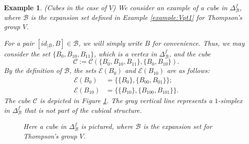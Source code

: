 \documentclass{amsart}
\newtheorem{Example}[theorem]{Example}
\newtheorem{standing assumption}[theorem]{Standing Assumption}
\newenvironment{example}{\begin{Example}\normalfont}{\end{Example}}
\begin{document}
\begin{example} \label{example:Vpt2}
(Cubes in the case of $V$)
We consider an example of a cube in $\Delta^{f}_{\mathcal{B}}$, where $\mathcal{B}$ is the expansion set defined in Example \ref{example:Vpt1} for Thompson's group $V$.

For a pair $[id_{\mid B}, B] \in \mathcal{B}$, we will simply write $B$ for convenience. Thus, we may
 consider the set $\{ B_{0}, B_{10}, B_{11} \}$, which is a vertex in $\Delta^{f}_{\mathcal{B}}$, and the cube 
 \[ \mathcal{C} := \mathcal{C}( \{ B_{0}, B_{10}, B_{11} \}, \{ B_{0}, B_{10} \}).\]
By the definition of $\mathcal{B}$, the sets $\mathcal{E}(B_{0})$ and $\mathcal{E}(B_{10})$ are as follows:
\begin{align*}
\mathcal{E}(B_{0}) &= \{ \{ B_{0} \}, \{ B_{00}, B_{01} \} \}; \\
\mathcal{E}(B_{10}) &= \{ \{ B_{10} \}, \{ B_{100}, B_{101} \} \}. 
\end{align*}
The cube $\mathcal{C}$ is depicted in Figure \ref{figure:1}. The gray vertical line represents a $1$-simplex in $\Delta^{f}_{\mathcal{B}}$ that is not part of the cubical structure.  

\begin{figure}[!h]
\begin{center}
\end{center}
\caption{Here a cube in $\Delta^{f}_{\mathcal{B}}$ is pictured, where 
$\mathcal{B}$ is the expansion set for Thompson's group $V$.}
\label{figure:1} 
\end{figure}
\end{example}
\end{document}

